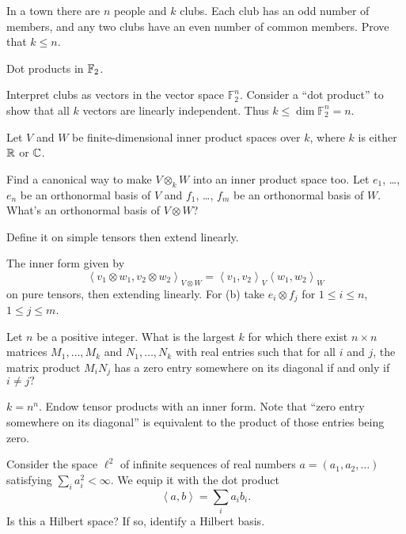 \begin{problem}
	\gim
	In a town there are $n$ people and $k$ clubs.
	Each club has an odd number of members,
	and any two clubs have an even number of common members.
	Prove that $k \le n$.
	\begin{hint}
		Dot products in $\mathbb F_2$.
	\end{hint}
	\begin{sol}
		Interpret clubs as vectors in the vector space $\mathbb F_2^n$.
		Consider a ``dot product'' to show that all $k$ vectors are linearly independent.
		Thus $k \le \dim \mathbb F_2^n = n$.
	\end{sol}
\end{problem}

\begin{sproblem}
	\label{prob:inner_prod_tensor}
	Let $V$ and $W$ be finite-dimensional inner product spaces over $k$,
	where $k$ is either $\mathbb R$ or $\mathbb C$.
	\begin{enumerate}[(a)]
		\ii Find a canonical way to make $V \otimes_k W$ into an inner product space too.
		\ii Let $e_1$, \dots, $e_n$ be an orthonormal basis of $V$
		and $f_1$, \dots, $f_m$ be an orthonormal basis of $W$.
		What's an orthonormal basis of $V \otimes W$?
	\end{enumerate}
	\begin{hint}
		Define it on simple tensors then extend linearly.
	\end{hint}
	\begin{sol}
		The inner form given by
		\[ \left< v_1 \otimes w_1 , v_2 \otimes w_2 \right>_{V \otimes W}
		= \left< v_1,v_2 \right>_V \left< w_1,w_2\right>_W \]
		on pure tensors, then extending linearly.
		For (b) take $e_i \otimes f_j$ for $1 \le i \le n$, $1 \le j \le m$.
	\end{sol}
\end{sproblem}

\begin{problem}[Putnam 2014]
	\gim
	Let $n$ be a positive integer.
	What is the largest $k$ for which there exist
	$n\times n$ matrices $M_1,\dots,M_k$ and $N_1,\dots,N_k$
	with real entries such that for all $i$ and $j$,
	the matrix product $M_i N_j$ has a zero entry somewhere
	on its diagonal if and only if $i \ne j?$
	\begin{hint}
		$k = n^n$.
		Endow tensor products with an inner form.
		Note that ``zero entry somewhere on its diagonal''
		is equivalent to the product of those entries being zero.
	\end{hint}
\end{problem}

\begin{problem}
	Consider the space $\ell^2$ of infinite sequences of real numbers
	$a = (a_1, a_2, \dots)$ satisfying $\sum_i a_i^2 < \infty$.
	We equip it with the dot product
	\[ \left< a, b\right> = \sum_i a_i b_i. \]
	Is this a Hilbert space?
	If so, identify a Hilbert basis.
\end{problem}
